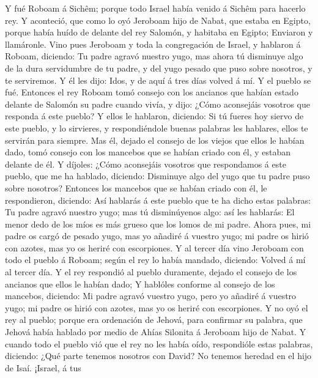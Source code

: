  Y fué Roboam á Sichêm; porque todo Israel había venido á
Sichêm para hacerlo rey.  Y aconteció, que como lo oyó
Jeroboam hijo de Nabat, que estaba en Egipto, porque había huído de
delante del rey Salomón, y habitaba en Egipto;  Enviaron y
llamáronle. Vino pues Jeroboam y toda la congregación de Israel, y
hablaron á Roboam, diciendo:  Tu padre agravó nuestro
yugo, mas ahora tú disminuye algo de la dura servidumbre de tu padre, y
del yugo pesado que puso sobre nosotros, y te serviremos. 
Y él les dijo: Idos, y de aquí á tres días volved á mí. Y el pueblo se
fué.  Entonces el rey Roboam tomó consejo con los ancianos
que habían estado delante de Salomón su padre cuando vivía, y dijo:
¿Cómo aconsejáis vosotros que responda á este pueblo?  Y
ellos le hablaron, diciendo: Si tú fueres hoy siervo de este pueblo, y
lo sirvieres, y respondiéndole buenas palabras les hablares, ellos te
servirán para siempre.  Mas él, dejado el consejo de los
viejos que ellos le habían dado, tomó consejo con los mancebos que se
habían criado con él, y estaban delante de él.  Y díjoles:
¿Cómo aconsejáis vosotros que respondamos á este pueblo, que me ha
hablado, diciendo: Disminuye algo del yugo que tu padre puso sobre
nosotros?  Entonces los mancebos que se habían criado con
él, le respondieron, diciendo: Así hablarás á este pueblo que te ha
dicho estas palabras: Tu padre agravó nuestro yugo; mas tú disminúyenos
algo: así les hablarás: El menor dedo de los míos es más grueso que los
lomos de mi padre.  Ahora pues, mi padre os cargó de
pesado yugo, mas yo añadiré á vuestro yugo; mi padre os hirió con
azotes, mas yo os heriré con escorpiones.  Y al tercer
día vino Jeroboam con todo el pueblo á Roboam; según el rey lo había
mandado, diciendo: Volved á mí al tercer día.  Y el rey
respondió al pueblo duramente, dejado el consejo de los ancianos que
ellos le habían dado;  Y hablóles conforme al consejo de
los mancebos, diciendo: Mi padre agravó vuestro yugo, pero yo añadiré á
vuestro yugo; mi padre os hirió con azotes, mas yo os heriré con
escorpiones.  Y no oyó el rey al pueblo; porque era
ordenación de Jehová, para confirmar su palabra, que Jehová había
hablado por medio de Ahías Silonita á Jeroboam hijo de Nabat.
 Y cuando todo el pueblo vió que el rey no les había
oído, respondióle estas palabras, diciendo: ¿Qué parte tenemos nosotros
con David? No tenemos heredad en el hijo de Isaí. ¡Israel, á tus
